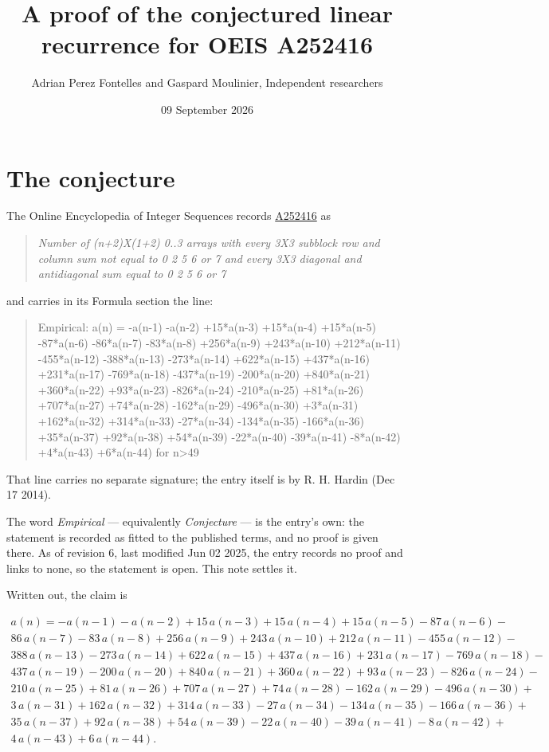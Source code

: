 \documentclass[11pt]{article}
\title{A proof of the conjectured linear recurrence for OEIS A252416}
\author{Adrian Perez Fontelles and Gaspard Moulinier, Independent researchers}
\date{09 September 2026}
\theoremstyle{definition}
\begin{document}
\maketitle
\section{The conjecture}

The Online Encyclopedia of Integer Sequences records \href{https://oeis.org/A252416}{A252416} as

\begin{quote}\itshape Number of (n+2)X(1+2) 0..3 arrays with every 3X3 subblock row and column sum not equal to 0 2 5 6 or 7 and every 3X3 diagonal and antidiagonal sum equal to 0 2 5 6 or 7\end{quote}

and carries in its Formula section the line:

\begin{quote}\ttfamily Empirical: a(n) = -a(n-1) -a(n-2) +15*a(n-3) +15*a(n-4) +15*a(n-5) -87*a(n-6) -86*a(n-7) -83*a(n-8) +256*a(n-9) +243*a(n-10) +212*a(n-11) -455*a(n-12) -388*a(n-13) -273*a(n-14) +622*a(n-15) +437*a(n-16) +231*a(n-17) -769*a(n-18) -437*a(n-19) -200*a(n-20) +840*a(n-21) +360*a(n-22) +93*a(n-23) -826*a(n-24) -210*a(n-25) +81*a(n-26) +707*a(n-27) +74*a(n-28) -162*a(n-29) -496*a(n-30) +3*a(n-31) +162*a(n-32) +314*a(n-33) -27*a(n-34) -134*a(n-35) -166*a(n-36) +35*a(n-37) +92*a(n-38) +54*a(n-39) -22*a(n-40) -39*a(n-41) -8*a(n-42) +4*a(n-43) +6*a(n-44) for n>49\end{quote}

That line carries no separate signature; the entry itself is by R. H. Hardin (Dec 17 2014).

The word {\itshape Empirical} --- equivalently {\itshape Conjecture} --- is the entry's own: the statement is recorded as fitted to the published terms, and no proof is given there. As of revision 6, last modified Jun 02 2025, the entry records no proof and links to none, so the statement is open. This note settles it.

Written out, the claim is

\begin{multline*} a(n) = -a(n-1) - a(n-2) + 15\,a(n-3) + 15\,a(n-4) + 15\,a(n-5) - 87\,a(n-6) - \\ 86\,a(n-7) - 83\,a(n-8) + 256\,a(n-9) + 243\,a(n-10) + 212\,a(n-11) - 455\,a(n-12) - \\ 388\,a(n-13) - 273\,a(n-14) + 622\,a(n-15) + 437\,a(n-16) + 231\,a(n-17) - 769\,a(n-18) - \\ 437\,a(n-19) - 200\,a(n-20) + 840\,a(n-21) + 360\,a(n-22) + 93\,a(n-23) - 826\,a(n-24) - \\ 210\,a(n-25) + 81\,a(n-26) + 707\,a(n-27) + 74\,a(n-28) - 162\,a(n-29) - 496\,a(n-30) + \\ 3\,a(n-31) + 162\,a(n-32) + 314\,a(n-33) - 27\,a(n-34) - 134\,a(n-35) - 166\,a(n-36) + \\ 35\,a(n-37) + 92\,a(n-38) + 54\,a(n-39) - 22\,a(n-40) - 39\,a(n-41) - 8\,a(n-42) + \\ 4\,a(n-43) + 6\,a(n-44). \end{multline*}
\end{document}
